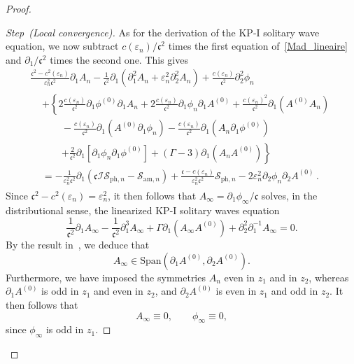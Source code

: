 \documentclass[10pt]{amsart}
\theoremstyle{definition}\newtheorem{defi}[theo]{Definition}\newtheorem{rema}[theo]{Remark}\newtheorem{exam}[theo]{Example}\newtheorem{exem}[theo]{Example}\newtheorem{nota}[theo]{Notation}
\newcommand*\p{\partial}
\newcommand{\amm}{\mathrm{am}}
\newcommand{\phl}{\mathrm{ph}}
\newcommand{\Span}{\mathrm{Span}}
\newcommand*\BI{\mathcal{I}}
\newcommand*\BS{\mathcal{S}}
\newcommand*\cs{{\mathfrak c}}
\newcommand*\ii{\infty}
\newcommand*\e{\varepsilon}
\newcommand*\G{\Gamma}
\newcounter{stepcount}
\newenvironment{step}[1]{\refstepcounter{stepcount}\begin{proof}[{Step~\thestepcount}{\;(#1)}]}{\let\qed\relax\end{proof}}
\begin{document}
\begin{proof}
\begin{step}{{Local convergence}}
As for the derivation of the KP-I solitary wave equation, we now subtract $ c(\e_n) / \cs^2 $ times the first equation of~\eqref{Mad_lineaire} and $
\p_{1}/\cs^2 $ times the second one. This gives
\begin{multline}\label{desing_lineaire}
\frac{\cs^2 - c^2(\e_n) }{\e_n^2 \cs^2} \p_{1} A_n - \frac{1}{\cs^2} \p_{1} \left(\p_{1}^2 A_n + \e_n^2 \p_2^2 A_n\right) + \frac{c(\e_n) }{ \cs^2} \p_2^2 \phi_n\\
\begin{aligned}
& +
\left\{ 2 \frac{c(\e_n)}{\cs^2} \p_{1} \phi^{(0)} \p_{1} A_n + 2 \frac{c(\e_n)}{\cs^2} \p_{1} \phi_n \p_{1} A^{(0)} + \frac{c(\e_n)^2}{\cs^2} \p_1 (A^{(0)} A_n)\right.\\
& \quad \quad - \frac{c(\e_n)}{\cs^2} \p_1 \left(A^{(0)} \p_{1} \phi_n\right) - \frac{c(\e_n)}{\cs^2} \p_1 \left(A_n \p_{1} \phi^{(0)}\right)\\
& \quad \quad\left. + \frac{2}{\cs^2} \p_{1} \left[\p_{1} \phi_n \p_{1} \phi^{(0)}\right] + (\Gamma - 3) \p_{1} \left(A_n A^{(0)}\right) \right\}
\\ & = - \frac{1}{\e_n^2 \cs^2} \p_{1} \left(\cs \BI \BS_{{\phl},n} - \BS_{{\amm},n}\right) + \frac{ \cs -c(\e_n) }{\e_n^2 \cs^2} \BS_{{\phl},n} - 2 \e_n^2 \p_{2} \phi_n \p_{2} A^{(0)}\,.
\end{aligned}
\end{multline}
Since $\cs^2 - c^2(\e_n) = \e_n^2 $, it then follows that $ A_\ii = \p_{1} \phi_\ii /\cs $ solves, in the distributional sense, the linearized KP-I solitary waves equation
\begin{equation}\label{SW_lineaire}
\frac{1}{\cs^2} \p_{1} A_\ii - \frac{1}{\cs^2} \p^3_{1} A_\ii + \G \p_{1} \left(A_\ii A^{(0)}\right) + \p_{2}^2 \p_{1}^{-1} A_\ii = 0.
\end{equation} By the result in~\cite[ Theorem~\ref{Lump_nondege}]{Liu_Wei_Lump}, we deduce that
\[
A_\ii \in \Span \left(\p_1 A^{(0)}, \p_2 A^{(0)}\right).
\]
Furthermore, we have imposed the symmetries $ A_n $ even in $z_1 $ and in $ z_2 $, whereas $ \p_1 A^{(0)} $ is odd in $z_1 $ and even in $ z_2 $, and $ \p_2 A^{(0)} $ is even in $ z_1 $ and odd in $z_2 $. It then follows that
\[
A_\ii \equiv 0,
\qquad
\phi_\ii \equiv 0,
\]
since $\phi_\ii $ is odd in $ z_1 $.
\end{step}



\end{proof}
\end{document}
